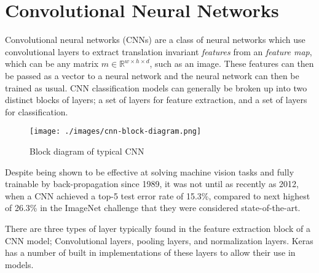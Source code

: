 \documentclass[12pt,a4paper,titlepage,twoside]{report}
\begin{document}
\section{Convolutional Neural Networks}
	Convolutional neural networks (CNNs) are a class of neural networks which use convolutional layers to extract translation invariant \textit{features} from an \textit{feature map}, which can be any matrix $m \in \mathbb{R}^{w \times h \times d}$\cite{cnn-analysis}, such as an image. These features can then be passed as a vector to a neural network and the neural network can then be trained as usual. CNN classification models can generally be broken up into two distinct blocks of layers; a set of layers for feature extraction, and a set of layers for classification. \par
	\begin{figure}[h!]
  		\centering
  		\texttt{[image: ./images/cnn-block-diagram.png]}
  		\caption{Block diagram of typical CNN}
  		\label{fig:cnn-block}
	\end{figure}
	Despite being shown to be effective at solving machine vision tasks and fully trainable by back-propagation since 1989\cite{cnn-backprop}, it was not until as recently as 2012, when a CNN achieved a top-5 test error rate of 15.3\%, compared to next highest of 26.3\% in the ImageNet challenge\cite{cnn-image-net} that they were considered state-of-the-art. \par
	
	There are three types of layer typically found in the feature extraction block of a CNN model; Convolutional layers, pooling layers, and normalization layers\cite{cnn-analysis}. Keras\cite{keras} has a number of built in  implementations of these layers to allow their use in models.
\end{document}
